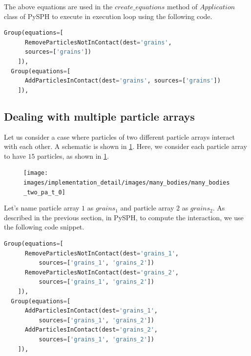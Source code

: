 The above equations are used in the $create\_equations$ method of $Application$
class of PySPH to execute in execution loop using the following code.
 \lstset{basicstyle=\footnotesize\ttfamily}
\begin{lstlisting}[label={contact:equations},frame=lines,language=Python,upquote=True]
  Group(equations=[
      RemoveParticlesNotInContact(dest='grains',
      sources=['grains'])
    ]),
  Group(equations=[
      AddParticlesInContact(dest='grains', sources=['grains'])
    ]),
\end{lstlisting}


\FloatBarrier%
\subsection{Dealing with multiple particle arrays}
Let us consider a case where particles of two different particle arrays
interact with each other. A schematic is shown in \cref{fig:mb:2_pa}. Here,
we consider each particle array to have $15$ particles, as shown in
\cref{fig:mb:2_pa}.
\begin{figure}[!htpb]
  \centering
  \texttt{[image: images/implementation\_detail/images/many\_bodies/many\_bodies\_two\_pa\_t\_0]}
  \caption{}
\label{fig:mb:2_pa}
\end{figure}
Let's name particle array $1$ as $grains_1$ and particle array $2$ as $grains_2$.
As described in the previous section, in PySPH, to compute the interaction, we
use the following code snippet.
 \lstset{basicstyle=\footnotesize\ttfamily}
\begin{lstlisting}[label={contact:equations},frame=lines,language=Python,upquote=True]
  Group(equations=[
      RemoveParticlesNotInContact(dest='grains_1',
          sources=['grains_1', 'grains_2'])
      RemoveParticlesNotInContact(dest='grains_2',
          sources=['grains_1', 'grains_2'])
    ]),
  Group(equations=[
      AddParticlesInContact(dest='grains_1',
          sources=['grains_1', 'grains_2'])
      AddParticlesInContact(dest='grains_2',
          sources=['grains_1', 'grains_2'])
    ]),
\end{lstlisting}


